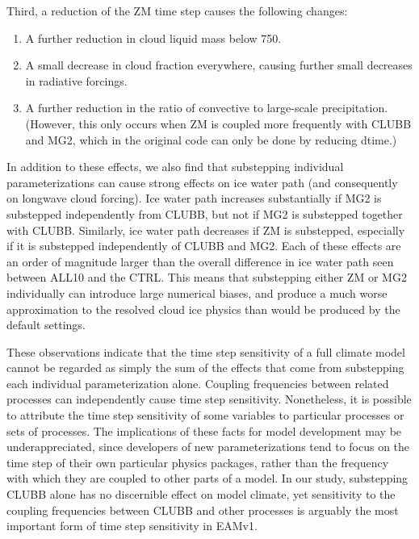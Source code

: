 \documentclass [11pt, proquest] {uwthesis}[2020/02/24]
\begin{document}
Third, a reduction of the ZM time step causes the following changes:

\begin{enumerate}
    \item A further reduction in cloud liquid mass below \SI{750}{\millibar}.
    \item A small decrease in cloud fraction everywhere, causing further small decreases in radiative forcings.
    \item A further reduction in the ratio of convective to large-scale precipitation. (However, this only occurs when ZM is coupled more frequently with CLUBB and MG2, which in the original code can only be done by reducing dtime.)
\end{enumerate}

In addition to these effects, we also find that substepping individual parameterizations can cause strong effects on ice water path (and consequently on longwave cloud forcing). Ice water path increases substantially if MG2 is substepped independently from CLUBB, but not if MG2 is substepped together with CLUBB. Similarly, ice water path decreases if ZM is substepped, especially if it is substepped independently of CLUBB and MG2. Each of these effects are an order of magnitude larger than the overall difference in ice water path seen between ALL10 and the CTRL. This means that substepping either ZM or MG2 individually can introduce large numerical biases, and produce a much worse approximation to the resolved cloud ice physics than would be produced by the default settings.

These observations indicate that the time step sensitivity of a full climate model cannot be regarded as simply the sum of the effects that come from substepping each individual parameterization alone. Coupling frequencies between related processes can independently cause time step sensitivity. Nonetheless, it is possible to attribute the time step sensitivity of some variables to particular processes or sets of processes. The implications of these facts for model development may be underappreciated, since developers of new parameterizations tend to focus on the time step of their own particular physics packages, rather than the frequency with which they are coupled to other parts of a model. In our study, substepping CLUBB alone has no discernible effect on model climate, yet sensitivity to the coupling frequencies between CLUBB and other processes is arguably the most important form of time step sensitivity in EAMv1.
\end{document}
